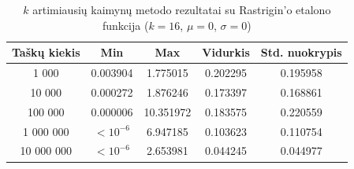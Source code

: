 \begin{table}[H]
    \centering
    \begin{tabular}{|c|c|c|c|c|}
        \hline
        \textbf{Taškų kiekis} & \textbf{Min} & \textbf{Max} & \textbf{Vidurkis} & \textbf{Std. nuokrypis} \\ \hline
        1 000        & 0.003904 & 1.775015 & 0.202295 & 0.195958 \\ \hline
        10 000       & 0.000272 & 1.876246 & 0.173397 & 0.168861 \\ \hline
        100 000      & 0.000006 & 10.351972 & 0.183575 & 0.220559 \\ \hline
        1 000 000    & $<10^{-6}$ & 6.947185 & 0.103623 & 0.110754 \\ \hline
        10 000 000   & $<10^{-6}$ & 2.653981 & 0.044245 & 0.044977 \\ \hline
    \end{tabular}
    \caption{$k$ artimiausių kaimynų metodo rezultatai su Rastrigin'o etalono funkcija ($k = 16$, $\mu = 0$, $\sigma = 0$)}
\end{table}